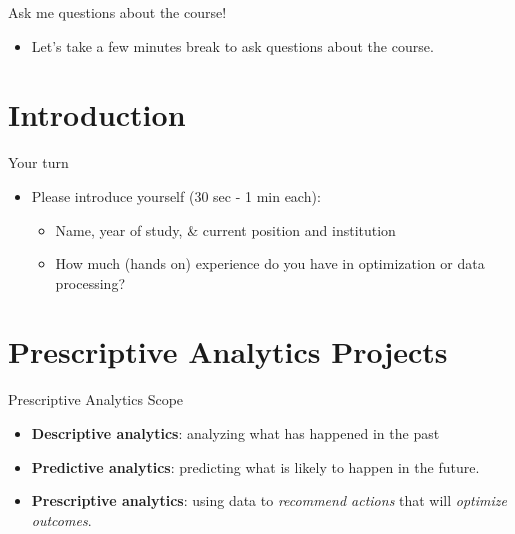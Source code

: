 \documentclass [xcolor=svgnames, handout]{beamer}
\begin{document}
\begin{frame}{Ask me questions about the course!}
    \begin{itemize}[<.->]
        \item Let's take a few minutes break to ask questions about the course.
    \end{itemize}
\end{frame}
    
\section{Introduction}
\begin{frame}{Your turn}
    \begin{itemize}[<.->]
        \item Please introduce yourself (30 sec - 1 min each):
        \begin{itemize}
            \item Name, year of study, \& current position and institution
            \item How much (hands on) experience do you have in optimization or data processing?
        \end{itemize}
    \end{itemize}
\end{frame}

\section{Prescriptive Analytics Projects}

\begin{frame}{Prescriptive Analytics Scope}
    \begin{itemize}[<.->]
        \item \textbf{Descriptive analytics}: analyzing what has happened in the past
        \item \textbf{Predictive analytics}: predicting what is likely to happen in the future.
        \item \textbf{Prescriptive analytics}: using data to \emph{recommend actions} that will \emph{optimize outcomes}.
    \end{itemize}
\end{frame}
\end{document}
